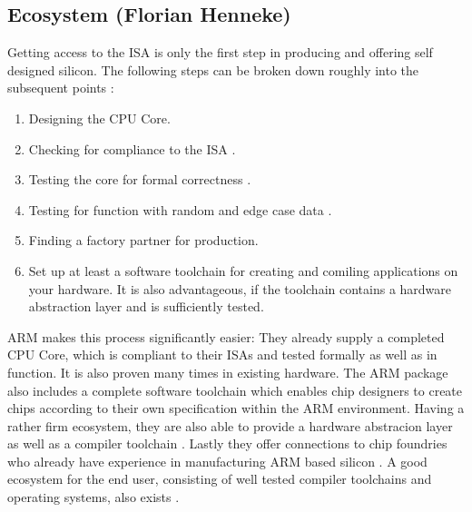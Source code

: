 \documentclass[conference]{IEEEtran}
\begin{document}
	\subsection{Ecosystem (Florian Henneke)}
	Getting access to the ISA is only the first step in producing and offering self designed silicon.
	The following steps can be broken down roughly into the subsequent points \cite{ARM2019}:
	\begin{enumerate}
		\item Designing the CPU Core.
		\item Checking for compliance to the ISA \cite{Bartley2020}.
		\item Testing the core for formal correctness \cite{Bartley2020}.
		\item Testing for function with random and edge case data \cite{Bartley2020}.
		\item Finding a factory partner for production.
		\item Set up at least a software toolchain for creating and comiling applications on your hardware. It is also advantageous, if the toolchain contains a hardware abstraction layer and is sufficiently tested.
	\end{enumerate}
	ARM makes this process significantly easier: They already supply a completed CPU Core, which is compliant to their \glspl{ISA} and tested formally as well as in function. It is also proven many times in existing hardware. The ARM package also includes a complete software toolchain which enables chip designers to create chips according to their own specification within the ARM environment. Having a rather firm ecosystem, they are also able to provide a hardware abstracion layer as well as a compiler toolchain \cite{CMSIS}. Lastly they offer connections to chip foundries who already have experience in manufacturing ARM based silicon \cite{ARM2019}.
	A good ecosystem for the end user, consisting of well tested compiler toolchains \cite{ARMGNU} and operating systems, also exists \cite{Microsoft2020}\cite{RedHat}.
\end{document}
